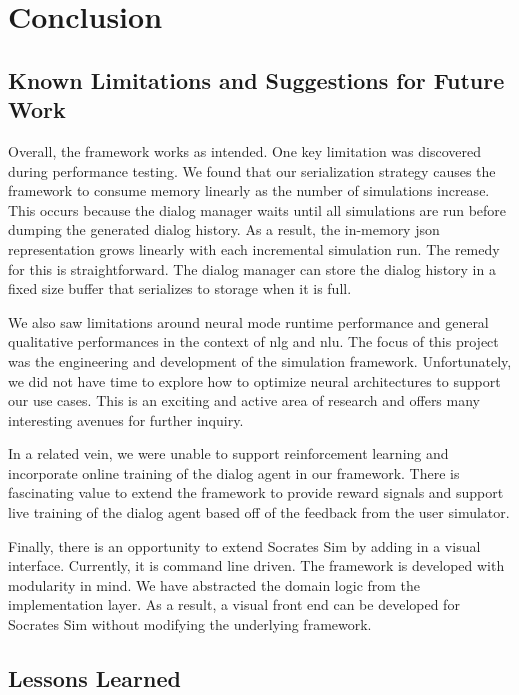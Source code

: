 \chapter{Conclusion}
\label{chap:conclusions}

\section{ Known Limitations and Suggestions for Future Work}
\label{sec:issues} 

Overall, the framework works as intended. One key limitation was discovered during performance testing. We found that our serialization strategy causes the framework to consume memory linearly as the number of simulations increase. This occurs because the dialog manager waits until all simulations are run before dumping the generated dialog history. As a result, the in-memory json representation grows linearly with each incremental simulation run. The remedy for this is straightforward. The dialog manager can store the dialog history in a fixed size buffer that serializes to storage when it is full. 

We also saw limitations around neural mode runtime performance and general qualitative performances in the context of nlg and nlu. The focus of this project was the engineering and development of the simulation framework. Unfortunately, we did not have time to explore how to optimize neural architectures to support our use cases. This is an exciting and active area of research and offers many interesting avenues for further inquiry.

In a related vein, we were unable to support reinforcement learning and incorporate online training of the dialog agent in our framework. There is fascinating value to extend the framework to provide reward signals and support live training of the dialog agent based off of the feedback from the user simulator. 

Finally, there is an opportunity to extend Socrates Sim by adding in a visual interface. Currently, it is command line driven. The framework is developed with modularity in mind. We have abstracted the domain logic from the implementation layer. As a result, a visual front end can be developed for Socrates Sim without modifying the underlying framework.

\section{Lessons Learned}
\label{sec:lessons}

